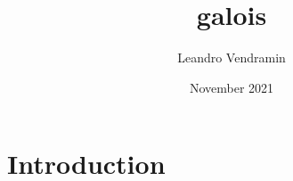 \documentclass{article}
\title{galois}
\author{Leandro Vendramin}
\date{November 2021}
\begin{document}
\maketitle

\section{Introduction}
\end{document}
